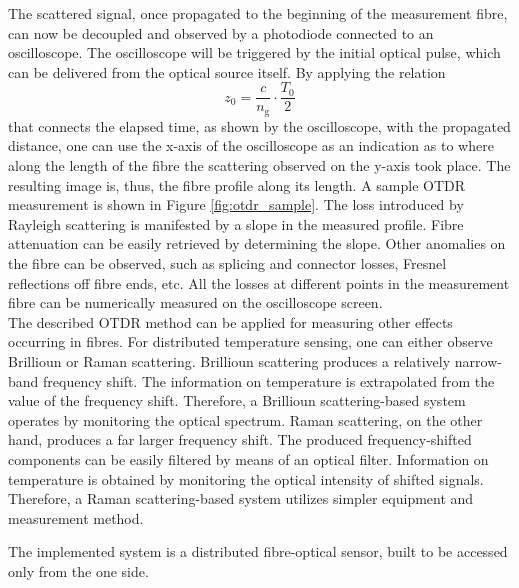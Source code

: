 \documentclass{standalone}
\begin{document}
The scattered signal, once propagated to the beginning of the measurement fibre, can now be decoupled and observed by a photodiode connected to an oscilloscope. The oscilloscope will be triggered by the initial optical pulse, which can be delivered from the optical source itself. By applying the relation 
\begin{equation} \label{eq:otdr_time_distance}
z_0 = \frac{c}{n_\textrm{g}} \cdot \frac{T_0}{2}
\end{equation}
that connects the elapsed time, as shown by the oscilloscope, with the propagated distance, one can use the x-axis of the oscilloscope as an indication as to where along the length of the fibre the scattering observed on the y-axis took place. The resulting image is, thus, the fibre profile along its length. A sample OTDR measurement is shown in Figure \ref{fig:otdr_sample}.
The loss introduced by Rayleigh scattering is manifested by a slope in the measured profile. Fibre attenuation can be easily retrieved by determining the slope. Other anomalies on the fibre can be observed, such as splicing and connector losses, Fresnel reflections off fibre ends, etc. All the losses at different points in the measurement fibre can be numerically measured on the oscilloscope screen.\\



The described OTDR method can be applied for measuring other effects occurring in fibres. For distributed temperature sensing, one can either observe Brillioun or Raman scattering. Brillioun scattering produces a relatively narrow-band frequency shift. The information on temperature is extrapolated from the value of the frequency shift. Therefore, a Brillioun scattering-based system operates by monitoring the optical spectrum. Raman scattering, on the other hand, produces a far larger frequency shift. The produced frequency-shifted components can be easily filtered by means of an optical filter. Information on temperature is obtained by monitoring the optical intensity of shifted signals. Therefore, a Raman scattering-based system utilizes simpler equipment and measurement method. 





The implemented system is a distributed fibre-optical sensor, built to be accessed only from the one side.


\setcounter{stranica}{\thepage}
\addtocounter{stranica}{1}
\end{document}
